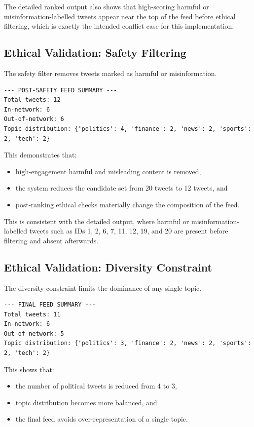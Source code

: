 \documentclass[]
{UCD_CS_41820_Report}
\begin{document}
The detailed ranked output also shows that high-scoring harmful or misinformation-labelled tweets appear near the top of the feed before ethical filtering, which is exactly the intended conflict case for this implementation.\

\subsection{Ethical Validation: Safety Filtering}

The safety filter removes tweets marked as harmful or misinformation.

\begin{verbatim}
--- POST-SAFETY FEED SUMMARY ---
Total tweets: 12
In-network: 6
Out-of-network: 6
Topic distribution: {'politics': 4, 'finance': 2, 'news': 2, 'sports': 2, 'tech': 2}
\end{verbatim}

This demonstrates that:
\begin{itemize}
    \item high-engagement harmful and misleading content is removed,
    \item the system reduces the candidate set from 20 tweets to 12 tweets, and
    \item post-ranking ethical checks materially change the composition of the feed.
\end{itemize}

This is consistent with the detailed output, where harmful or misinformation-labelled tweets such as IDs 1, 2, 6, 7, 11, 12, 19, and 20 are present before filtering and absent afterwards.

\subsection{Ethical Validation: Diversity Constraint}

The diversity constraint limits the dominance of any single topic.

\begin{verbatim}
--- FINAL FEED SUMMARY ---
Total tweets: 11
In-network: 6
Out-of-network: 5
Topic distribution: {'politics': 3, 'finance': 2, 'news': 2, 'sports': 2, 'tech': 2}
\end{verbatim}

This shows that:
\begin{itemize}
    \item the number of political tweets is reduced from 4 to 3,
    \item topic distribution becomes more balanced, and
    \item the final feed avoids over-representation of a single topic.
\end{itemize}
\end{document}
